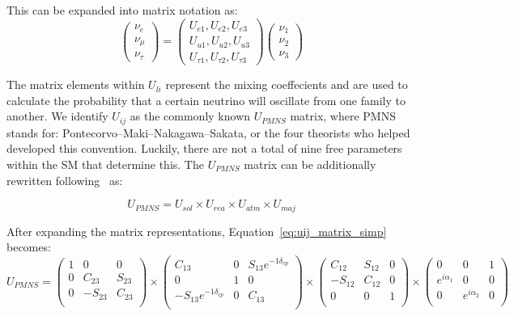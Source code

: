 This can be expanded into matrix notation as:
\begin{equation}~\label{eq:mass_eigenstates}
\begin{pmatrix}
\nu_e\\
\nu_{\mu}\\
\nu_{\tau}
\end{pmatrix}
=
\begin{pmatrix}
U_{e1}, U_{e2}, U_{e3} \\
U_{u1}, U_{u2}, U_{u3} \\
U_{\tau1}, U_{\tau2}, U_{\tau3}
\end{pmatrix}
\begin{pmatrix}
\nu_1\\
\nu_2\\
\nu_3
\end{pmatrix}
\end{equation}

The matrix elements within $U_{li}$ represent the mixing coeffecients and are used to calculate the probability that a certain neutrino will oscillate from one family to another.
We identify $U_{ij}$ as the commonly known $U_{PMNS}$ matrix, where PMNS stands for: Pontecorvo–Maki–Nakagawa–Sakata, or the four theorists who helped developed this convention.
Luckily, there are not a total of nine free parameters within the SM that determine this.
The $U_{PMNS}$ matrix can be additionally rewritten following~\citep{Pontecorvo:1957qd, 1962PThPh..28..870M} as:

\begin{equation}~\label{eq:uij_matrix_simp}
U_{PMNS}
=
U_{sol} \times U_{rea} \times U_{atm} \times U_{maj}
\end{equation}

After expanding the matrix representations, Equation~\ref{eq:uij_matrix_simp} becomes:
\begin{equation}
U_{PMNS}
=
\begin{pmatrix}
1 & 0 & 0 \\
0 & C_{23} & S_{23} \\
0 & -S_{23} & C_{23} \\
\end{pmatrix}
\times
\begin{pmatrix}
C_{13} & 0 & S_{13}e^{-1\delta_{cp}} \\
0 & 1 & 0 \\
-S_{13}e^{-1\delta_{cp}} & 0 & C_{13} \\
\end{pmatrix}
\times
\begin{pmatrix}
C_{12} & S_{12} & 0 \\
-S_{12} & C_{12} & 0 \\
0 & 0 & 1 \\
\end{pmatrix}
\times
\begin{pmatrix}
0 & 0 & 1 \\
e^{i\alpha_{1}} & 0 & 0 \\
0 & e^{i\alpha_{2}} & 0 \\
\end{pmatrix}
\end{equation}

